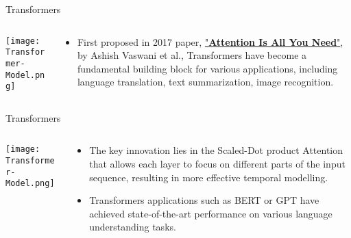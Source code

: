 \documentclass{beamer}
\begin{document}
\begin{frame}[fragile]{Transformers}
    \begin{columns}[T]
        \begin{column}{.48\textwidth}
            \begin{center}
                \texttt{[image: Transformer-Model.png]}
            \end{center}
        \end{column}%
        \hfill%
        \begin{column}{.48\textwidth}
            \begin{itemize}
                \item First proposed in 2017 paper, \href{https://arxiv.org/abs/1706.03762}{"\textbf{Attention Is All You Need}"}, by Ashish Vaswani et al., Transformers have become a fundamental building block for various applications, including language translation, text summarization, image recognition.
            \end{itemize}
        \end{column}%
    \end{columns}
\end{frame}
\begin{frame}[fragile]{Transformers}
    \begin{columns}[T]
        \begin{column}{.48\textwidth}
            \begin{center}
                \texttt{[image: Transformer-Model.png]}
            \end{center}
        \end{column}%
        \hfill%
        \begin{column}{.48\textwidth}
            \begin{itemize}
                \item The key innovation lies in the Scaled-Dot product Attention that allows each layer to focus on different parts of the input sequence, resulting in more effective temporal modelling.
                \item Transformers applications such as BERT or GPT have achieved state-of-the-art performance on various language understanding tasks.
            \end{itemize}
        \end{column}%
    \end{columns}
\end{frame}
\end{document}
